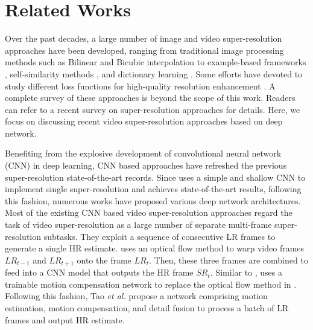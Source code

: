 \documentclass[letterpaper]{article} %
\begin{document}
\section{Related Works}

Over the past decades, a large number of image and video super-resolution approaches have been developed, ranging from traditional image processing methods such as Bilinear and Bicubic interpolation to example-based frameworks \cite{Timofte2014Anchored,Jeong2015Multi,Xiong2013Example,Freedman2011TOG}, self-similarity methods \cite{Huang2015Single,Yang2010Exploiting}, and dictionary learning \cite{Perezpellitero2016PSyCo}. Some efforts have devoted to study different loss functions for high-quality resolution enhancement \cite{Sajjadi2017ICCV}. A complete survey of these approaches is beyond the scope of this work. Readers can refer to a recent survey \cite{Walha2016,Agustsson2017cvpr} on super-resolution approaches for details. Here, we focus on discussing recent video super-resolution approaches based on deep network.

Benefiting from the explosive development of convolutional neural network (CNN) in deep learning, CNN based approaches have refreshed the previous super-resolution state-of-the-art records. Since \cite{Dong2014Learning} uses a simple and shallow CNN to implement single super-resolution and achieves state-of-the-art results, following this fashion, numerous works have proposed various deep network architectures. Most of the existing CNN based video super-resolution approaches regard the task of video super-resolution as a large number of separate multi-frame super-resolution subtasks. They exploit a sequence of consecutive LR frames to generate a single HR estimate. \cite{VSRNet2016TCT} uses an optical flow method to warp video frames $LR_{t-1}$ and $LR_{t+1}$ onto the frame $LR_t$. Then, these three frames are combined to feed into a CNN model that outputs the HR frame $SR_t$. Similar to \cite{VSRNet2016TCT}, \cite{VESPCN2017cvpr} uses a trainable motion compensation network to replace the optical flow method in \cite{VSRNet2016TCT}. Following this fashion, Tao \textit{et al.} \cite{Tao2017iccv} propose a network comprising motion estimation, motion compensation, and detail fusion to process a batch of LR frames and output HR estimate.

\end{document}
